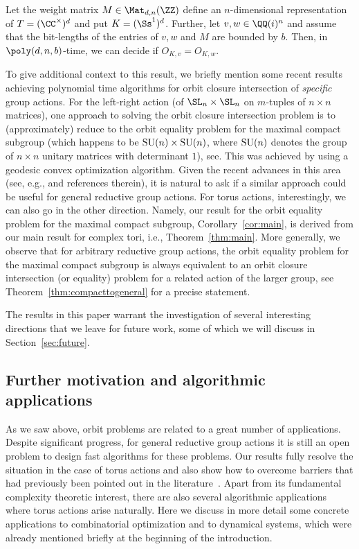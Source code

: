 \begin{corollary}\label{cor:main}
Let the weight matrix $M \in\Mat_{d,n}(\ZZ)$ define an $n$-dimensional representation of  $T=(\CC^\times)^d$ and put $K = (\Ss^1)^d$.
Further, let $v,w \in \QQ(i)^n$ and assume that the bit-lengths of the entries of $v,w$ and $M$ are bounded by $b$.
Then, in $\poly(d,n,b)$-time, we can decide if $O_{K,v} = O_{K,w}$.
\end{corollary}

To give additional context to this result, we briefly mention some recent results achieving polynomial time algorithms for orbit closure intersection of \emph{specific} group actions.
For the left-right action (of $\SL_n \times \SL_n$ on $m$-tuples of $n \times n$ matrices), one approach to solving the orbit closure intersection problem is to (approximately) reduce to the orbit equality problem for the maximal compact subgroup (which happens to be ${\rm SU}(n) \times {\rm SU}(n)$, where ${\rm SU}(n)$ denotes the group of $n \times n$ unitary matrices with determinant $1$), see\cite{AZGLOW}.
This was achieved by using a geodesic convex optimization algorithm.
Given the recent advances in this area (see, e.g., \cite{BFGOWW2} and references therein), it is natural to ask if a similar approach could be useful for general reductive group actions.
For torus actions, interestingly, we can also go in the other direction.
Namely, our result for the orbit equality problem for the maximal compact subgroup, Corollary~\ref{cor:main}, is derived from our main result for complex tori, i.e., Theorem~\ref{thm:main}.
More generally, we observe that for arbitrary reductive group actions, the orbit equality problem for the maximal compact subgroup is always equivalent to an orbit closure intersection (or equality) problem for a related action of the larger group, see Theorem~\ref{thm:compacttogeneral} for a precise statement.

%

The results in this paper warrant the investigation of several interesting directions that we leave for future work, some of which we will discuss in Section~\ref{sec:future}.

%
\subsection{Further motivation and algorithmic applications}\label{subsec:applications}
%
As we saw above, orbit problems are related to a great number of applications.
Despite significant progress, for general reductive group actions it is still an open problem to design fast algorithms for these problems.
Our results fully resolve the situation in the case of torus actions and also show how to overcome barriers that had previously been pointed out in the literature~\cite{ikenmeyer2017vanishing,GIMOWW}.
Apart from its fundamental complexity theoretic interest, there are also several algorithmic applications where torus actions arise naturally.
Here we discuss in more detail some concrete applications to combinatorial optimization and to dynamical systems,
which were already mentioned briefly at the beginning of the introduction.

